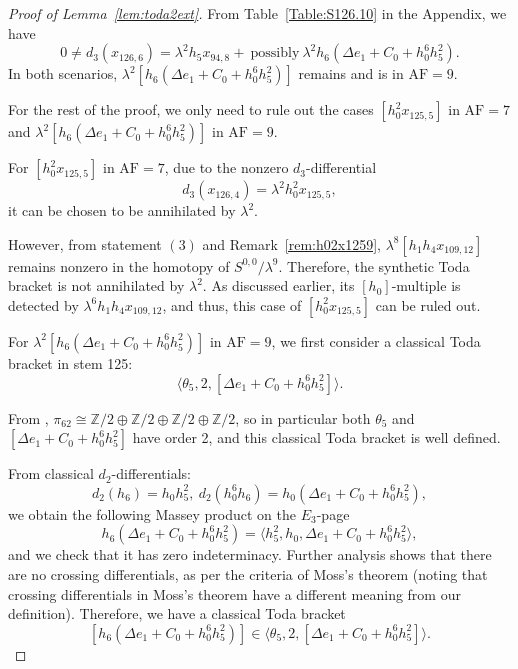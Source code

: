 \documentclass{amsart}
\numberwithin{equation}{section}
\newcommand{\AF}{\mathrm{AF}}
\begin{document}
\begin{proof}[Proof of Lemma~\ref{lem:toda2ext}]
From Table~\ref{Table:S126.10} in the Appendix, we have
$$0 \neq d_3(x_{126,6}) = \lambda^2 h_5 x_{94,8} + \ \text{possibly} \ \lambda^2 h_6(\Delta e_1 +C_0+h_0^6h_5^2).$$ 
In both scenarios, $\lambda^2 [h_6(\Delta e_1 +C_0+h_0^6h_5^2)]$ remains and is in $\AF=9$.

For the rest of the proof, we only need to rule out the cases $[h_0^2 x_{125,5}]$ in $\AF=7$ and $\lambda^2 [h_6(\Delta e_1 +C_0+h_0^6h_5^2)]$ in $\AF=9$. 

For $[h_0^2 x_{125,5}]$ in $\AF=7$, due to the nonzero $d_3$-differential
$$d_3(x_{126,4}) = \lambda^2 h_0^2 x_{125,5},$$
it can be chosen to be annihilated by $\lambda^2$. 

However, from statement $(3)$ and Remark~\ref{rem:h02x1259}, $\lambda^8 [h_1h_4x_{109,12}]$ remains nonzero in the homotopy of $S^{0,0}/\lambda^9$. Therefore, the synthetic Toda bracket is not annihilated by $\lambda^2$. As discussed earlier, its $[h_0]$-multiple is detected by $\lambda^6 h_1h_4x_{109,12}$, and thus, this case of $[h_0^2 x_{125,5}]$ can be ruled out.



For $\lambda^2 [h_6(\Delta e_1 +C_0+h_0^6h_5^2)]$ in $\AF=9$, we first consider a classical Toda bracket in stem 125:
$$\langle \theta_5, 2, [\Delta e_1 +C_0+h_0^6h_5^2] \rangle.$$

From \cite{Xu, IWX}, $\pi_{62} \cong \mathbb{Z}/2 \oplus \mathbb{Z}/2 \oplus \mathbb{Z}/2 \oplus \mathbb{Z}/2$, so in particular both $\theta_5$ and $[\Delta e_1 +C_0+h_0^6h_5^2]$ have order 2, and this classical Toda bracket is well defined.

From classical $d_2$-differentials:
$$d_2(h_6) = h_0h_5^2, \ d_2(h_0^6h_6)= h_0(\Delta e_1 +C_0+h_0^6h_5^2),$$
we obtain the following Massey product on the $E_3$-page
$$h_6(\Delta e_1 +C_0+h_0^6h_5^2) = \langle h_5^2, h_0, \Delta e_1 +C_0+h_0^6h_5^2 \rangle,$$
and we check that it has zero indeterminacy. Further analysis shows that there are no crossing differentials, as per the criteria of Moss's theorem \cite[Theorem~1.2]{Moss} (noting that crossing differentials in Moss's theorem have a different meaning from our definition). Therefore, we have a classical Toda bracket 
$$[h_6(\Delta e_1 +C_0+h_0^6h_5^2)] \in \langle \theta_5, 2, [\Delta e_1 +C_0+h_0^6h_5^2] \rangle.$$


\end{proof}
\end{document}
